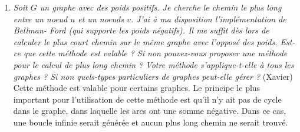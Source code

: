 \documentclass[11pt]{article}
\begin{document}
\begin{enumerate}
\item \textit{Soit $G$ un graphe avec des poids positifs. Je cherche le chemin le plus long entre
un noeud $u$ et un noeuds $v$. J’ai à ma disposition l’implémentation de Bellman-
Ford (qui supporte les poids négatifs). Il me suffit dès lors de calculer le plus
court chemin sur le même graphe avec l’opposé des poids. Est-ce que cette méthode
est valable ? Si non pouvez-vous proposer une méthode pour le calcul de
plus long chemin ? Votre méthode s’applique-t-elle à tous les graphes ? Si non
quels-types particuliers de graphes peut-elle gérer ?} (Xavier)\\

Cette méthode est valable pour certains graphes. Le principe le plus important pour l'utilisation de cette méthode est qu'il n'y ait pas de cycle dans le graphe, dans laquelle les arcs ont une somme négative. Dans ce cas, une boucle infinie serait générée et aucun plus long chemin ne serait trouvé.

\end{enumerate}
\end{document}
